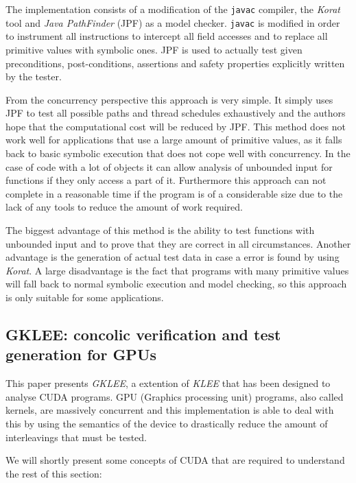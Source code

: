 \documentclass[10pt]{llncs}
\begin{document}
The implementation consists of a modification of the \texttt{javac} compiler, the \emph{Korat} tool \cite{korat} and \emph{Java PathFinder} (JPF) \cite{pathfinder} as a model checker. \texttt{javac} is modified in order to instrument all instructions to intercept all field accesses and to replace all primitive values with symbolic ones. JPF is used to actually test given preconditions, post-conditions, assertions and safety properties explicitly written by the tester.

From the concurrency perspective this approach is very simple. It simply uses JPF to test all possible paths and thread schedules exhaustively and the authors hope that the computational cost will be reduced by JPF. This method does not work well for applications that use a large amount of primitive values, as it falls back to basic symbolic execution that does not cope well with concurrency. In the case of code with a lot of objects it can allow analysis of unbounded input for functions if they only access a part of it. Furthermore this approach can not complete in a reasonable time if the program is of a considerable size due to the lack of any tools to reduce the amount of work required.

The biggest advantage of this method is the ability to test functions with unbounded input and to prove that they are correct in all circumstances. Another advantage is the generation of actual test data in case a error is found by using \emph{Korat}. A large disadvantage is the fact that programs with many primitive values will fall back to normal symbolic execution and model checking, so this approach is only suitable for some applications.

\subsection{GKLEE: concolic verification and test generation for GPUs \cite{base7}}

This paper presents \emph{GKLEE}, a extention of \emph{KLEE} \cite{klee} that has been designed to analyse CUDA \cite{cuda} programs. GPU (Graphics processing unit) programs, also called kernels, are massively concurrent and this implementation is able to deal with this by using the semantics of the device to drastically reduce the amount of interleavings that must be tested.

We will shortly present some concepts of CUDA that are required to understand the rest of this section:
\end{document}
